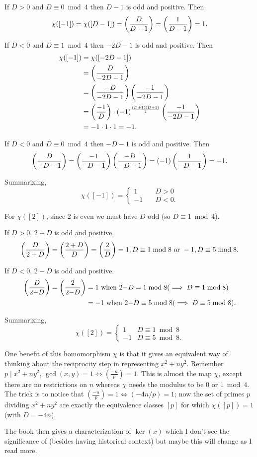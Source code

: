 If $D>0$ and $D\equiv 0\bmod 4$ then $D-1$ is odd and positive. Then
\[\chi([-1]) = \chi([D-1]) = \left(\frac{D}{D-1}\right) = \left(\frac{1}{D-1}\right) = 1.\]

If $D<0$ and $D\equiv 1\bmod 4$ then $-2D-1$ is odd and positive. Then
\begin{align*}
  \chi([-1]) &= \chi([-2D-1])\\
             &= \left(\frac{D}{-2D-1}\right)\\
             &= \left(\frac{-D}{-2D-1}\right)\left(\frac{-1}{-2D-1}\right)\\
             &= \left(\frac{-1}{D}\right)\cdot(-1)^\frac{(D+1)(D+1)}{2}\left(\frac{-1}{-2D-1}\right)\\
             &= -1\cdot 1\cdot 1 = -1.
\end{align*}

If $D<0$ and $D\equiv 0\bmod 4$ then $-D-1$ is odd and positive. Then
\[\left(\frac{D}{-D-1}\right) = \left(\frac{-1}{-D-1}\right)\left(\frac{-D}{-D-1}\right) = (-1)\left(\frac{1}{-D-1}\right) = -1.\]

Summarizing,
\[\chi([-1]) =
  \begin{cases}
    1&\quad D>0\\
    -1&\quad D<0.
  \end{cases}
\]

For $\chi([2])$, since 2 is even we must have $D$ odd (so $D\equiv 1\bmod 4$).

If $D>0$, $2+D$ is odd and positive.
\[\left(\frac{D}{2+D}\right) = \left(\frac{2+D}{D}\right) = \left(\frac{2}{D}\right) = 1, D\equiv 1\bmod 8\text{ or }-1, D\equiv 5\bmod 8.\]

If $D<0$, $2{-}D$ is odd and positive.
\begin{align*}
\left(\frac{D}{2{-}D}\right) = \left(\frac{2}{2{-}D}\right) &= 1\text{ when }2{-}D=1\bmod 8 (\implies D\equiv 1\bmod 8)\\
&=-1\text{ when }2{-}D\equiv 5\bmod 8 (\implies D\equiv 5\bmod 8).
\end{align*}

Summarizing,
\[\chi([2]) =
  \begin{cases}
    1& D\equiv 1\bmod 8\\
    -1& D\equiv 5\bmod 8.
  \end{cases}
\]

One benefit of this homomorphism $\chi$ is that it gives an equivalent way of thinking about the reciprocity step in representing $x^2 + ny^2$.
Remember $p\mid x^2+ny^2$, $\gcd(x,y)=1 \iff (\frac{-n}{p})=1$.
This is almost the map $\chi$, except there are no restrictions on $n$ whereas $\chi$ needs the modulus to be 0 or $1\bmod 4$.
The trick is to notice that $(\frac{-n}{p})=1 \iff (-4n/p)=1$; now the set of primes $p$ dividing $x^2+ny^2$ are exactly the equivalence classes $[p]$ for which $\chi([p])=1$ (with $D=-4n$).

The book then gives a characterization of $\ker(x)$ which I don't see the significance of (besides having historical context) but maybe this will change as I read more.


